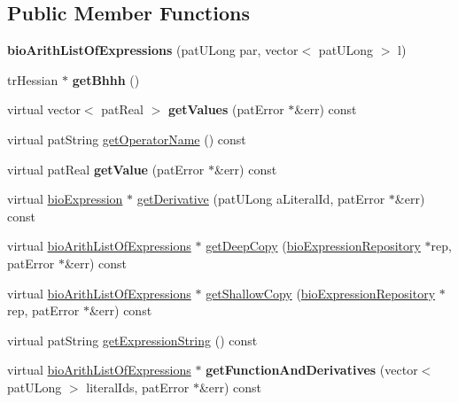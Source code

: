 \subsection*{Public Member Functions}
\begin{DoxyCompactItemize}
\item 
\mbox{\label{classbio_arith_list_of_expressions_a6ed575066b9d2f8acb4edc914cb743b9}} 
{\bfseries bio\+Arith\+List\+Of\+Expressions} (pat\+U\+Long par, vector$<$ pat\+U\+Long $>$ l)
\item 
\mbox{\label{classbio_arith_list_of_expressions_ae6f687023278e7369c6c922c11275375}} 
tr\+Hessian $\ast$ {\bfseries get\+Bhhh} ()
\item 
\mbox{\label{classbio_arith_list_of_expressions_a4c5a136ef5028e8e8dc4ada39195d87f}} 
virtual vector$<$ pat\+Real $>$ {\bfseries get\+Values} (pat\+Error $\ast$\&err) const
\item 
virtual pat\+String \hyperlink{classbio_arith_list_of_expressions_af0c6e016d69454ac0b7d4f889190807e}{get\+Operator\+Name} () const
\item 
\mbox{\label{classbio_arith_list_of_expressions_a12892de13bdd862f8671bad5dab68394}} 
virtual pat\+Real {\bfseries get\+Value} (pat\+Error $\ast$\&err) const
\item 
virtual \hyperlink{classbio_expression}{bio\+Expression} $\ast$ \hyperlink{classbio_arith_list_of_expressions_a14fe977b86bc69c4b3afe59d44b6c03f}{get\+Derivative} (pat\+U\+Long a\+Literal\+Id, pat\+Error $\ast$\&err) const
\item 
virtual \hyperlink{classbio_arith_list_of_expressions}{bio\+Arith\+List\+Of\+Expressions} $\ast$ \hyperlink{classbio_arith_list_of_expressions_af13c0c6710776c02d3f7c0e27d5cd724}{get\+Deep\+Copy} (\hyperlink{classbio_expression_repository}{bio\+Expression\+Repository} $\ast$rep, pat\+Error $\ast$\&err) const
\item 
virtual \hyperlink{classbio_arith_list_of_expressions}{bio\+Arith\+List\+Of\+Expressions} $\ast$ \hyperlink{classbio_arith_list_of_expressions_afd5867cdac9cea54a704a075412b3c08}{get\+Shallow\+Copy} (\hyperlink{classbio_expression_repository}{bio\+Expression\+Repository} $\ast$rep, pat\+Error $\ast$\&err) const
\item 
virtual pat\+String \hyperlink{classbio_arith_list_of_expressions_ac6a8b9493bc91520a1882df3cddc383d}{get\+Expression\+String} () const
\item 
\mbox{\label{classbio_arith_list_of_expressions_a22bfedcbe9c678289be1e8040a73a8ca}} 
virtual \hyperlink{classbio_arith_list_of_expressions}{bio\+Arith\+List\+Of\+Expressions} $\ast$ {\bfseries get\+Function\+And\+Derivatives} (vector$<$ pat\+U\+Long $>$ literal\+Ids, pat\+Error $\ast$\&err) const
\end{DoxyCompactItemize}
